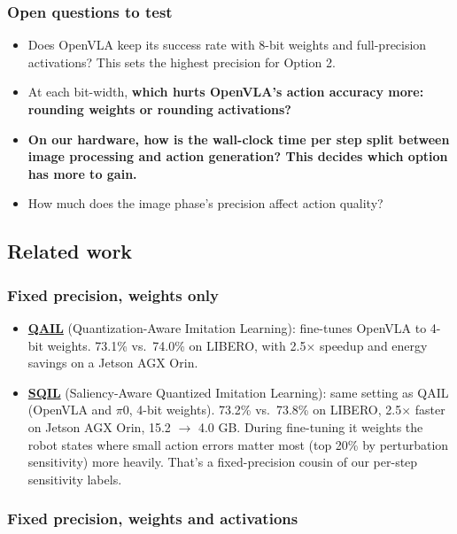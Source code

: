 \documentclass[11pt]{article}
\begin{document}
\subsubsection{Open questions to test}\label{open-questions-to-test}

\begin{itemize}
\item Does OpenVLA keep its success rate with 8-bit weights and full-precision activations? This sets the highest precision for Option 2.
\item At each bit-width, \textbf{which hurts OpenVLA's action accuracy more: rounding weights or rounding activations?}
\item \textbf{On our hardware, how is the wall-clock time per step split between image processing and action generation? This decides which option has more to gain.}
\item How much does the image phase's precision affect action quality?
\end{itemize}

\subsection{Related work}\label{related-work}

\subsubsection{Fixed precision, weights only}\label{fixed-precision-weights-only}

\begin{itemize}
\item \textbf{\href{https://arxiv.org/pdf/2412.01034}{QAIL}} (Quantization-Aware Imitation Learning): fine-tunes OpenVLA to 4-bit weights. 73.1\% vs.~74.0\% on LIBERO, with 2.5$\times$ speedup and energy savings on a Jetson AGX Orin.
\item \textbf{\href{https://arxiv.org/abs/2505.15304}{SQIL}} (Saliency-Aware Quantized Imitation Learning): same setting as QAIL (OpenVLA and $\pi$0, 4-bit weights). 73.2\% vs.~73.8\% on LIBERO, 2.5$\times$ faster on Jetson AGX Orin, 15.2 $\rightarrow$ 4.0 GB. During fine-tuning it weights the robot states where small action errors matter most (top 20\% by perturbation sensitivity) more heavily. That's a fixed-precision cousin of our per-step sensitivity labels.
\end{itemize}

\subsubsection{Fixed precision, weights and activations}\label{fixed-precision-weights-and-activations}
\end{document}
